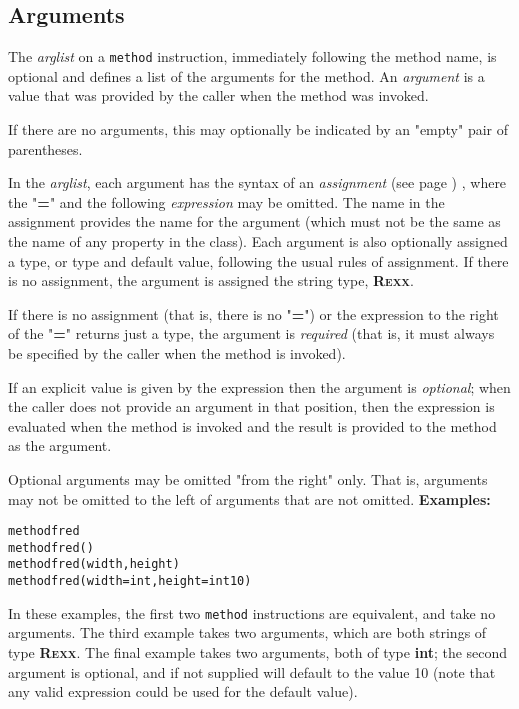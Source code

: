 \subsection{Arguments}
 
The \emph{arglist} on a \texttt{method} instruction, immediately
following the method name, is optional and defines a list of the
arguments for the method.  An \emph{argument} is a value that was
provided by the caller when the method was invoked.
 
If there are no arguments, this may optionally be indicated by an
"empty" pair of parentheses.
 
In the \emph{arglist}, each argument has the syntax of an
 \emph{assignment} (see page \pageref{refassign}) , where the "\textbf{=}"
and the following \emph{expression} may be omitted.
The name in the assignment provides the name for the argument (which
must not be the same as the name of any property in the class).
Each argument is also optionally assigned a type, or type and default
value, following the usual rules of assignment.
If there is no assignment, the argument is assigned the \nr{} string
type, \textbf{R\textsc{exx}}.
 
If there is no assignment (that is, there is no "\textbf{=}") or
the expression to the right of the "\textbf{=}" returns just a
type, the argument is \emph{required} (that is, it must always be
specified by the caller when the method is invoked).
 
If an explicit value is given by the expression then the argument is
\emph{optional}; when the caller does not provide an argument in that
position, then the expression is evaluated when the method is invoked
and the result is provided to the method as the argument.
 
Optional arguments may be omitted "from the right" only.
That is, arguments may not be omitted to the left of arguments that are
not omitted.
 \textbf{Examples:}
\begin{alltt}
method fred
method fred()
method fred(width, height)
method fred(width=int, height=int 10)
\end{alltt}
In these examples, the first two \texttt{method} instructions are
equivalent, and take no arguments.
The third example takes two arguments, which are both strings
of type \textbf{R\textsc{exx}}.
The final example takes two arguments, both of type \textbf{int}; the
second argument is optional, and if not supplied will default to the
value 10 (note that any valid expression could be used for the default
value).
